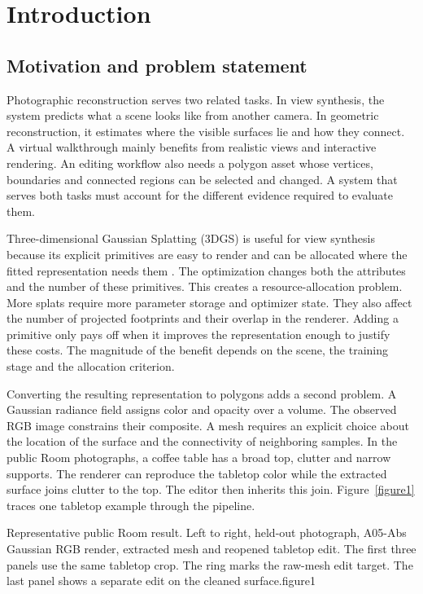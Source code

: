 \section{Introduction}
\subsection{Motivation and problem statement}
Photographic reconstruction serves two related tasks. In view synthesis, the system predicts what a scene looks like from another camera. In geometric reconstruction, it estimates where the visible surfaces lie and how they connect. A virtual walkthrough mainly benefits from realistic views and interactive rendering. An editing workflow also needs a polygon asset whose vertices, boundaries and connected regions can be selected and changed. A system that serves both tasks must account for the different evidence required to evaluate them.

Three-dimensional Gaussian Splatting (3DGS) is useful for view synthesis because its explicit primitives are easy to render and can be allocated where the fitted representation needs them \cite{ref4}. The optimization changes both the attributes and the number of these primitives. This creates a resource-allocation problem. More splats require more parameter storage and optimizer state. They also affect the number of projected footprints and their overlap in the renderer. Adding a primitive only pays off when it improves the representation enough to justify these costs. The magnitude of the benefit depends on the scene, the training stage and the allocation criterion.

Converting the resulting representation to polygons adds a second problem. A Gaussian radiance field assigns color and opacity over a volume. The observed RGB image constrains their composite. A mesh requires an explicit choice about the location of the surface and the connectivity of neighboring samples. In the public Room photographs, a coffee table has a broad top, clutter and narrow supports. The renderer can reproduce the tabletop color while the extracted surface joins clutter to the top. The editor then inherits this join. Figure~\ref{figure1} traces one tabletop example through the pipeline.

  {Representative public Room result. Left to right, held-out photograph, A05-Abs Gaussian RGB render, extracted mesh and reopened tabletop edit. The first three panels use the same tabletop crop. The ring marks the raw-mesh edit target. The last panel shows a separate edit on the cleaned surface.}{figure1}

